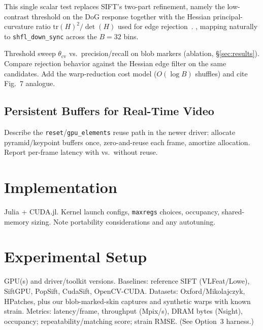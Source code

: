 This single scalar test replaces SIFT's two-part refinement, namely the
low-contrast threshold on the DoG response together with the Hessian
principal-curvature ratio $\mathrm{tr}(H)^2/\det(H)$ used for edge
rejection~\cite{lowe2004}. , mapping
naturally to \texttt{shfl\_down\_sync} across the $B=32$ bins.

\begin{fillbox}
Threshold sweep $\theta_{\mathrm{cv}}$ vs.\ precision/recall on blob markers
(ablation, \S\ref{sec:results}). Compare rejection behavior against the Hessian
edge filter on the same candidates. Add the warp-reduction cost model
($O(\log B)$ shuffles) and cite Fig.~7 analogue.
\end{fillbox}

\subsection{Persistent Buffers for Real-Time Video}
\label{sec:persist}
\begin{fillbox}
Describe the \texttt{reset}/\texttt{gpu\_elements} reuse path in the newer
driver: allocate pyramid/keypoint buffers once, zero-and-reuse each frame,
amortize allocation. Report per-frame latency with vs.\ without reuse.
\end{fillbox}

\section{Implementation}
\label{sec:impl}
\begin{fillbox}
Julia + CUDA.jl. Kernel launch configs, \texttt{maxregs} choices, occupancy,
shared-memory sizing. Note portability considerations and any autotuning.
\end{fillbox}

\section{Experimental Setup}
\label{sec:setup}
\begin{fillbox}
GPU(s) and driver/toolkit versions. Baselines: reference SIFT (VLFeat/Lowe),
SiftGPU, PopSift, CudaSift, OpenCV-CUDA. Datasets: Oxford/Mikolajczyk,
HPatches, plus our blob-marked-skin captures and synthetic warps with known
strain. Metrics: latency/frame, throughput (Mpix/s), DRAM bytes (Nsight),
occupancy; repeatability/matching score; strain RMSE. (See Option~3 harness.)
\end{fillbox}

